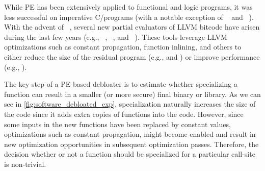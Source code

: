 %
%
While PE has been extensively applied to functional and logic programs, it was
less successful on imperative C/\cpp programs (with a notable exception of
\cmix~\cite{Andersen94} and \tempo~\cite{Consel98}). With the advent of
\llvm~\cite{llvm}, several new partial evaluators of LLVM bitcode have arisen
during the last few years (e.g., \llpe~\cite{llpe}, \occam~\cite{occam}, and
\trimmer~\cite{trimmer}). These tools leverage LLVM optimizations such as
constant propagation, function inlining, and others to either reduce the size of
the residual program (e.g., \occam and \trimmer) or improve performance (e.g.,
\llpe).

The key step of a PE-based debloater is to estimate whether specializing a function can result in a smaller (or more secure) final binary or library.
As we can see in \cref{fig:software_debloated_exp}, specialization naturally increases the size of the code since it adds extra copies of functions into the code. However, since some inputs in the new functions have been replaced by constant values, optimizations such as constant propagation, might become enabled and result in new optimization opportunities in subsequent optimization passes. Therefore, the decision whether or not a function should be specialized for a particular call-site is non-trivial.